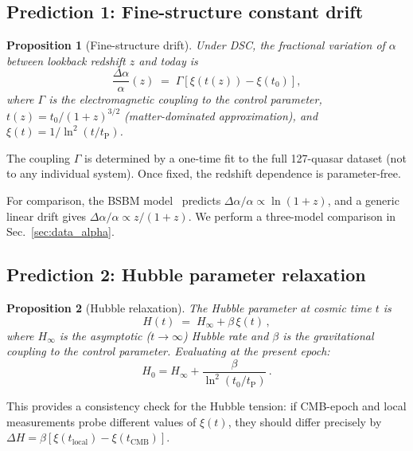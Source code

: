 \documentclass[twocolumn,showpacs,preprintnumbers,amsmath,amssymb,prd]{revtex4-2}
\newtheorem{proposition}{Proposition}
\newcommand{\lnq}{\ln^2}
\newcommand{\tP}{t_{\mathrm{P}}}
\newcommand{\Hinf}{H_{\infty}}
\begin{document}
\subsection{Prediction 1: Fine-structure constant drift}
\label{sec:alpha}

\begin{proposition}[Fine-structure drift]\label{prop:alpha}
Under DSC, the fractional variation of $\alpha$ between lookback
redshift $z$ and today is
\begin{equation}
  \frac{\Delta\alpha}{\alpha}(z)
  \;=\; \Gamma\!\left[\xi(t(z)) - \xi(t_0)\right],
  \label{eq:dalpha}
\end{equation}
where $\Gamma$ is the electromagnetic coupling to the control
parameter, $t(z) = t_0/(1+z)^{3/2}$ (matter-dominated
approximation), and $\xi(t) = 1/\lnq(t/\tP)$.
\end{proposition}

The coupling $\Gamma$ is determined by a one-time fit to the
full 127-quasar dataset (not to any individual system).
Once fixed, the redshift dependence is parameter-free.

For comparison, the BSBM model~\cite{Sandvik2002} predicts
$\Delta\alpha/\alpha \propto \ln(1+z)$, and a generic linear
drift gives $\Delta\alpha/\alpha \propto z/(1+z)$.
We perform a three-model comparison in Sec.~\ref{sec:data_alpha}.

\subsection{Prediction 2: Hubble parameter relaxation}
\label{sec:hubble}

\begin{proposition}[Hubble relaxation]\label{prop:hubble}
The Hubble parameter at cosmic time $t$ is
\begin{equation}
  H(t) \;=\; \Hinf + \beta\,\xi(t)\,,
  \label{eq:Ht}
\end{equation}
where $\Hinf$ is the asymptotic ($t\to\infty$) Hubble rate and
$\beta$ is the gravitational coupling to the control parameter.
Evaluating at the present epoch:
\begin{equation}
  H_0 = \Hinf + \frac{\beta}{\lnq(t_0/\tP)}\,.
  \label{eq:H0}
\end{equation}
\end{proposition}

This provides a consistency check for the Hubble tension: if
CMB-epoch and local measurements probe different values of
$\xi(t)$, they should differ precisely by
$\Delta H = \beta[\xi(t_{\mathrm{local}}) - \xi(t_{\mathrm{CMB}})]$.
\end{document}
